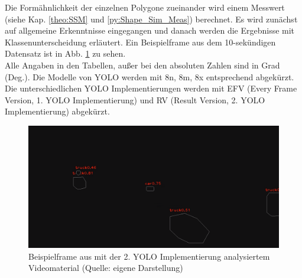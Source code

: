 {Die Formähnlichkeit der einzelnen Polygone zueinander wird einem Messwert  (siehe Kap. \ref{theo:SSM} und \ref{py:Shape_Sim_Meas}) berechnet. Es wird zunächst auf allgemeine Erkenntnisse eingegangen und danach werden die Ergebnisse mit Klassenunterscheidung erläutert. Ein Beispielframe aus dem 10-sekündigen Datensatz ist in Abb. \ref{Bsp_ErgebRVA10s_Vidmat} zu sehen.\\
Alle Angaben in den Tabellen, außer bei den absoluten Zahlen sind in Grad (Deg.). Die Modelle von YOLO werden mit 8n, 8m, 8x entsprechend abgekürzt. Die unterschiedlichen YOLO Implementierungen werden mit EFV (Every Frame Version, 1. YOLO Implementierung) und RV (Result Version, 2. YOLO Implementierung) abgekürzt.

\begin{figure}[ht]
	\centering
	\includegraphics*[scale = 0.35, keepaspectratio ]{images/Evaluation/Screenshot_A10s_RV.png}
	\caption[Beispielframe aus mit der direkten YOLO Anwendung analysiertem Videomaterial]{Beispielframe aus mit der 2. YOLO Implementierung analysiertem Videomaterial (Quelle: eigene Darstellung)} 
	\label{Bsp_ErgebRVA10s_Vidmat}
\end{figure}




}
